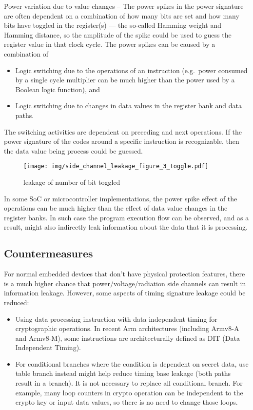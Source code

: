 \documentclass[
  a4paper,
]{report}
\providecommand{\tightlist}{%
  \setlength{\itemsep}{0pt}\setlength{\parskip}{0pt}}
\begin{document}
Power variation due to value changes -- The power spikes in the power
signature are often dependent on a combination of how many bits are set
and how many bits have toggled in the register(s) --- the so-called
Hamming weight and Hamming distance, so the amplitude of the spike could
be used to guess the register value in that clock cycle. The power
spikes can be caused by a combination of

\begin{itemize}
\tightlist
\item
  Logic switching due to the operations of an instruction (e.g.~power
  consumed by a single cycle multiplier can be much higher than the
  power used by a Boolean logic function), and
\item
  Logic switching due to changes in data values in the register bank and
  data paths.
\end{itemize}

The switching activities are dependent on preceding and next operations.
If the power signature of the codes around a specific instruction is
recognizable, then the data value being process could be guessed.

\begin{figure}
\centering
\texttt{[image: img/side\_channel\_leakage\_figure\_3\_toggle.pdf]}
\caption{leakage of number of bit toggled}
\end{figure}

In some SoC or microcontroller implementations, the power spike effect
of the operations can be much higher than the effect of data value
changes in the register banks. In such case the program execution flow
can be observed, and as a result, might also indirectly leak information
about the data that it is processing.

\hypertarget{countermeasures}{%
\subsection{Countermeasures}\label{countermeasures}}

For normal embedded devices that don't have physical protection
features, there is a much higher chance that power/voltage/radiation
side channels can result in information leakage. However, some aspects
of timing signature leakage could be reduced:

\begin{itemize}
\tightlist
\item
  Using data processing instruction with data independent timing for
  cryptographic operations. In recent Arm architectures (including
  Armv8-A and Armv8-M), some instructions are architecturally defined as
  DIT (Data Independent Timing).
\item
  For conditional branches where the condition is dependent on secret
  data, use table branch instead might help reduce timing base leakage
  (both paths result in a branch). It is not necessary to replace all
  conditional branch. For example, many loop counters in crypto
  operation can be independent to the crypto key or input data values,
  so there is no need to change those loops.
\end{itemize}
\end{document}
